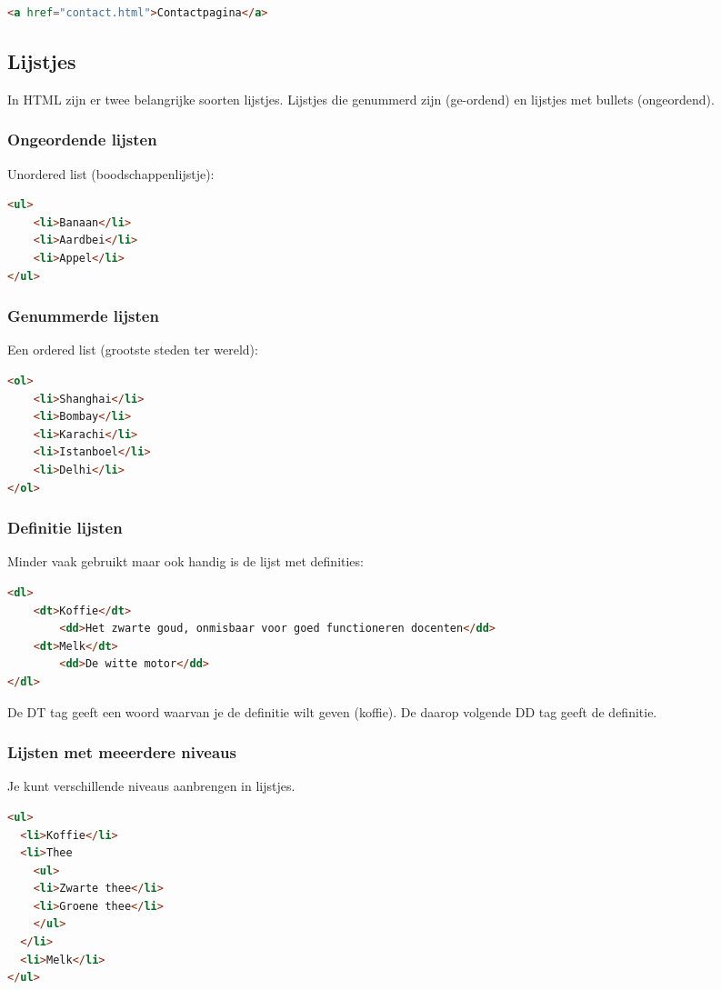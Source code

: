 \documentclass[8pt,pagesize,footinclude=false,headinclude=false]{scrartcl}
\begin{document}
\begin{multicols*}{4}
\begin{lstlisting}[language=HTML]
<a href="contact.html">Contactpagina</a>
\end{lstlisting}

\subsection*{Lijstjes}
In HTML zijn er twee belangrijke soorten lijstjes. Lijstjes die genummerd zijn (ge-ordend) en lijstjes met bullets (ongeordend).

\subsubsection*{Ongeordende lijsten}
Unordered list (boodschappenlijstje): 
\begin{lstlisting}[language=HTML]
<ul>
	<li>Banaan</li>
	<li>Aardbei</li>
	<li>Appel</li>
</ul>
\end{lstlisting}

\subsubsection*{Genummerde lijsten}
Een ordered list (grootste steden ter wereld):
\begin{lstlisting}[language=HTML]
<ol>
	<li>Shanghai</li>
	<li>Bombay</li>
	<li>Karachi</li>
	<li>Istanboel</li>
	<li>Delhi</li>
</ol>
\end{lstlisting}

\subsubsection*{Definitie lijsten}
Minder vaak gebruikt maar ook handig is de lijst met definities:
\begin{lstlisting}[language=HTML]
<dl>
	<dt>Koffie</dt>
		<dd>Het zwarte goud, onmisbaar voor goed functioneren docenten</dd>
	<dt>Melk</dt>
		<dd>De witte motor</dd>
</dl>
\end{lstlisting}
\noindent De DT tag geeft een woord waarvan je de definitie wilt geven (koffie). De daarop volgende DD tag geeft de definitie.

\subsubsection*{Lijsten met meeerdere niveaus}
Je kunt verschillende niveaus aanbrengen in lijstjes.

\begin{lstlisting}[language=HTML]
<ul>
  <li>Koffie</li>
  <li>Thee
    <ul>
    <li>Zwarte thee</li>
    <li>Groene thee</li>
    </ul>
  </li>
  <li>Melk</li>
</ul>
\end{lstlisting}


\end{multicols*}
\end{document}
